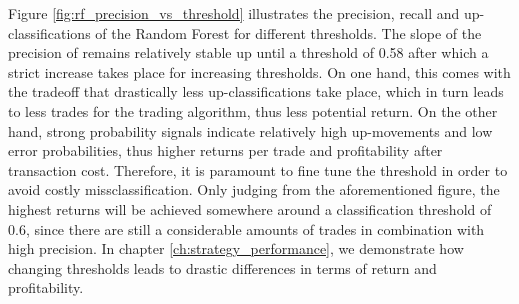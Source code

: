 Figure \ref{fig:rf_precision_vs_threshold} illustrates the precision, recall and up-classifications of the Random Forest for different thresholds.
The slope of the precision of remains relatively stable up until a threshold of 0.58 after which a strict increase takes place for increasing thresholds.
On one hand, this comes with the tradeoff that drastically less up-classifications take place, 
which in turn leads to less trades for the trading algorithm, thus less potential return.
On the other hand, strong probability signals indicate relatively high up-movements and low error probabilities, 
thus higher returns per trade and profitability after transaction cost.
Therefore, it is paramount to fine tune the threshold in order to avoid costly missclassification.
Only judging from the aforementioned figure, the highest returns will be achieved somewhere around 
a classification threshold of 0.6, since there are still a considerable amounts of trades in
combination with high precision.
In chapter \ref{ch:strategy_performance}, we demonstrate how changing thresholds leads to drastic
differences in terms of return and profitability.









